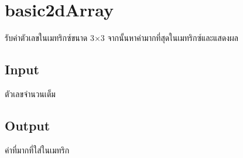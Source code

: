 \documentclass{article}
\begin{document}
\section*{basic2dArray}

รับค่าตัวเลขในเมทริกซ์ขนาด 3×3 จากนั้นหาค่ามากที่สุดในเมทริกซ์และแสดงผล\\



\subsection*{Input}
ตัวเลขจำนวนเต็ม



\subsection*{Output}
ค่าที่มากที่ใส่ในเมทริก
\end{document}
